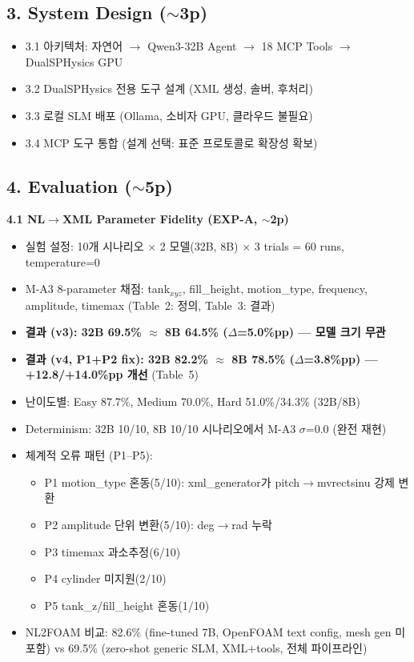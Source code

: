 \documentclass[11pt,a4paper]{article}
\begin{document}
\subsection{3. System Design ({\small\color{gray}$\sim$3p})}
\begin{itemize}[nosep,leftmargin=1.5em]
\item 3.1 아키텍처: 자연어 $\rightarrow$ Qwen3-32B Agent $\rightarrow$ 18 MCP Tools $\rightarrow$ DualSPHysics GPU
\item 3.2 DualSPHysics 전용 도구 설계 (XML 생성, 솔버, 후처리)
\item 3.3 로컬 SLM 배포 (Ollama, 소비자 GPU, 클라우드 불필요)
\item 3.4 MCP 도구 통합 (설계 선택: 표준 프로토콜로 확장성 확보)
\end{itemize}

\subsection{4. Evaluation ({\small\color{gray}$\sim$5p})}

\textbf{4.1 NL$\rightarrow$XML Parameter Fidelity (EXP-A, {\small\color{gray}$\sim$2p})}
\begin{itemize}[nosep,leftmargin=1.5em]
\item 실험 설정: 10개 시나리오 $\times$ 2 모델(32B, 8B) $\times$ 3 trials = 60 runs, temperature=0
\item M-A3 8-parameter 채점: tank$_{xyz}$, fill\_height, motion\_type, frequency, amplitude, timemax
  (Table~2: 정의, Table~3: 결과)
\item \textbf{결과 (v3): 32B 69.5\% $\approx$ 8B 64.5\% ($\Delta$=5.0\%pp) --- 모델 크기 무관}
\item \textbf{결과 (v4, P1+P2 fix): 32B 82.2\% $\approx$ 8B 78.5\% ($\Delta$=3.8\%pp) --- +12.8/+14.0\%pp 개선} (Table~5)
\item 난이도별: Easy 87.7\%, Medium 70.0\%, Hard 51.0\%/34.3\% (32B/8B)
\item Determinism: 32B 10/10, 8B 10/10 시나리오에서 M-A3 $\sigma$=0.0 (완전 재현)
\item 체계적 오류 패턴 (P1--P5):
  \begin{itemize}[nosep,leftmargin=1em]
  \item P1 motion\_type 혼동(5/10): xml\_generator가 pitch$\rightarrow$mvrectsinu 강제 변환
  \item P2 amplitude 단위 변환(5/10): deg$\rightarrow$rad 누락
  \item P3 timemax 과소추정(6/10)
  \item P4 cylinder 미지원(2/10)
  \item P5 tank\_z/fill\_height 혼동(1/10)
  \end{itemize}
\item NL2FOAM 비교: 82.6\% (fine-tuned 7B, OpenFOAM text config, mesh gen 미포함) vs 69.5\% (zero-shot generic SLM, XML+tools, 전체 파이프라인)
\end{itemize}
\end{document}
